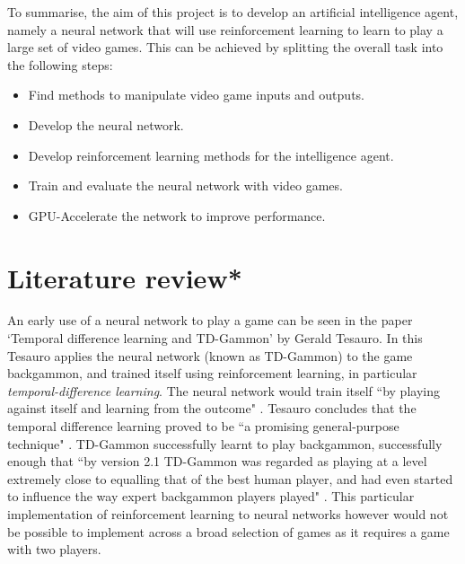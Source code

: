 \documentclass[10pt]{article}
\begin{document}
	To summarise, the aim of this project is to develop an artificial intelligence agent, namely a neural network that will use reinforcement learning to learn to play a large set of video games. This can be achieved by splitting the overall task into the following steps:
	
	\begin{itemize}
		\item Find methods to manipulate video game inputs and outputs.
		\item Develop the neural network.
		\item Develop reinforcement learning methods for the intelligence agent.
		\item Train and evaluate the neural network with video games.
		\item GPU-Accelerate the network to improve performance.
	\end{itemize}
	
	\bigskip

\section{Literature review*}
	
		
		An early use of a neural network to play a game can be seen in the paper `Temporal difference learning and TD-Gammon' by Gerald Tesauro. In this Tesauro applies the neural network (known as TD-Gammon) to the game backgammon, and trained itself using reinforcement learning, in particular \textit{temporal-difference learning}. The neural network would train itself ``by playing against itself and learning from the outcome" \cite{tdgammon}. Tesauro concludes that the temporal difference learning proved to be ``a promising general-purpose technique" \cite{tdgammon}. TD-Gammon successfully learnt to play backgammon, successfully enough that ``by version 2.1 TD-Gammon was regarded as playing at a level extremely close to equalling that of the best human player, and had even started to influence the way expert backgammon players played" \cite{tdgammon}. This particular implementation of reinforcement learning to neural networks however would not be possible to implement across a broad selection of games as it requires a game with two players.\\
		
\end{document}
